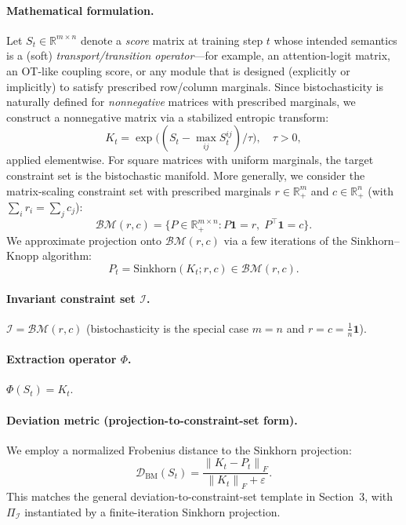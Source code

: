 \documentclass[11pt]{article}
\newcommand{\R}{\mathbb{R}}
\newcommand{\norm}[1]{\left\lVert #1 \right\rVert}
\newcommand{\eps}{\varepsilon}
\begin{document}
\paragraph{Mathematical formulation.}
Let $S_t\in\R^{m\times n}$ denote a \emph{score} matrix at training step $t$ whose intended semantics is a (soft) \emph{transport/transition operator}---for example, an attention-logit matrix, an OT-like coupling score, or any module that is designed (explicitly or implicitly) to satisfy prescribed row/column marginals. Since bistochasticity is naturally defined for \emph{nonnegative} matrices with prescribed marginals, we construct a nonnegative matrix via a stabilized entropic transform:
\begin{equation}
K_t = \exp\!\big((S_t - \max_{ij} S_t^{ij})/\tau\big), \quad \tau>0,
\end{equation}
applied elementwise. For square matrices with uniform marginals, the target constraint set is the bistochastic manifold. More generally, we consider the matrix-scaling constraint set with prescribed marginals $r\in\R^m_{+}$ and $c\in\R^n_{+}$ (with $\sum_i r_i=\sum_j c_j$):
\begin{equation}
\mathcal{BM}(r,c) = \{P\in\R^{m\times n}_{+}: P\mathbf{1}=r,\; P^\top\mathbf{1}=c\}.
\end{equation}
We approximate projection onto $\mathcal{BM}(r,c)$ via a few iterations of the Sinkhorn--Knopp algorithm:
\begin{equation}
P_t = \text{Sinkhorn}(K_t; r,c)\in\mathcal{BM}(r,c).
\end{equation}

\paragraph{Invariant constraint set $\mathcal{I}$.}
$\mathcal{I} = \mathcal{BM}(r,c)$ (bistochasticity is the special case $m=n$ and $r=c=\tfrac{1}{n}\mathbf{1}$).

\paragraph{Extraction operator $\Phi$.}
$\Phi(S_t) = K_t$.

\paragraph{Deviation metric (projection-to-constraint-set form).}
We employ a normalized Frobenius distance to the Sinkhorn projection:
\begin{equation}
\mathcal{D}_{\text{BM}}(S_t)
=
\frac{\norm{K_t - P_t}_F}{\norm{K_t}_F+\eps}.
\end{equation}
This matches the general deviation-to-constraint-set template in Section~3, with $\Pi_{\mathcal{I}}$ instantiated by a finite-iteration Sinkhorn projection.
\end{document}
